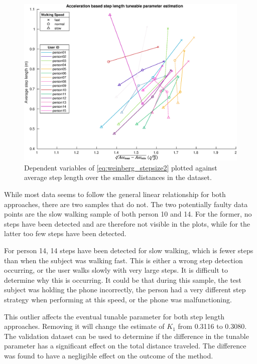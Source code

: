 \begin{figure}[h]
	\centering
	\includegraphics[width=0.8\linewidth]{images/20201128_1317_}
	\caption{Dependent variables of \eqref{eq:weinberg_stepsize2} plotted against average step length over the smaller distances in the \citet{Vezocnik2019} dataset.}
	\label{fig:step_length_weinberg}
\end{figure}

While most data seems to follow the general linear relationship for both approaches, there are two samples that do not. The two potentially faulty data points are the slow walking sample of both person 10 and 14. For the former, no steps have been detected and are therefore not visible in the plots, while for the latter too few steps have been detected. \par 

For person 14, 14 steps have been detected for slow walking, which is fewer steps than when the subject was walking fast. This is either a wrong step detection occurring, or the user walks slowly with very large steps. It is difficult to determine why this is occurring. It could be that during this sample, the test subject was holding the phone incorrectly, the person had a very different step strategy when performing at this speed, or the phone was malfunctioning. \par 

This outlier affects the eventual tunable parameter for both step length approaches. Removing it will change the estimate of $K_1$ from 0.3116 to 0.3080. The validation dataset can be used to determine if the difference in the tunable parameter has a significant effect on the total distance traveled. The difference was found to have a negligible effect on the outcome of the method.

